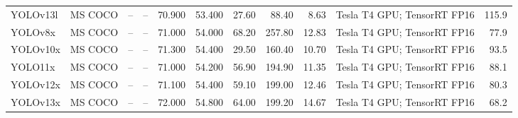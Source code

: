 \begin{table}[t]
{\begin{tabular}{lrrrrrrrrrr}
YOLOv13l & MS COCO & -- & -- & 70.900 & 53.400 & 27.60 & 88.40 & 8.63 & Tesla T4 GPU; TensorRT FP16 & 115.9 \\
YOLOv8x & MS COCO & -- & -- & 71.000 & 54.000 & 68.20 & 257.80 & 12.83 & Tesla T4 GPU; TensorRT FP16 & 77.9 \\
YOLOv10x & MS COCO & -- & -- & 71.300 & 54.400 & 29.50 & 160.40 & 10.70 & Tesla T4 GPU; TensorRT FP16 & 93.5 \\
YOLO11x & MS COCO & -- & -- & 71.000 & 54.200 & 56.90 & 194.90 & 11.35 & Tesla T4 GPU; TensorRT FP16 & 88.1 \\
YOLOv12x & MS COCO & -- & -- & 71.100 & 54.400 & 59.10 & 199.00 & 12.46 & Tesla T4 GPU; TensorRT FP16 & 80.3 \\
YOLOv13x & MS COCO & -- & -- & 72.000 & 54.800 & 64.00 & 199.20 & 14.67 & Tesla T4 GPU; TensorRT FP16 & 68.2 \\
\bottomrule
\end{tabular}
}
\end{table}

